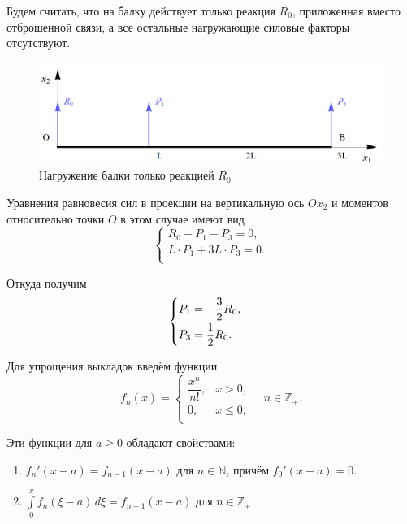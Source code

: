 \documentclass[12pt, a4paper]{article}
\begin{document}
Будем считать, что на балку действует только реакция $R_0$, приложенная вместо отброшенной связи, а все остальные нагружающие силовые факторы отсутствуют.

\begin{figure}[!h]
	\centering
	\includegraphics[width=0.75\linewidth]{plot-4}
	\caption{Нагружение балки только реакцией $R_0$}
\end{figure}

Уравнения равновесия сил в проекции на вертикальную ось $Ox_2$ и моментов относительно точки $O$ в этом случае имеют вид
\vspace{-0.5em}
\begin{equation*}
	\begin{cases}
		R_0 + P_1 + P_3 = 0, \\ 
		L \cdot P_1 + 3L \cdot P_3 = 0. \\
	\end{cases}
\end{equation*}

Откуда получим
\begin{equation}
	\begin{cases} \vspace{0.25em}
		P_1 = - \dfrac{3}{2} R_0, \\ 
		P_3 = \dfrac{1}{2} R_0. \\
	\end{cases}
	\label{eqP0P1R}
\end{equation}

Для упрощения выкладок введём функции
\[
f_n(x) = 
\begin{cases}
	\dfrac{x^n}{n!}, & x > 0, \\ 
	0, & x \leq 0, \\
\end{cases}
\quad n \in \mathbb{Z}_+.
\]

\newpage

Эти функции для $a \geq 0$ обладают свойствами:
\begin{enumerate}
	\item $f_n'(x - a) = f_{n-1}(x - a)$ для $n \in \mathbb{N}$, причём $f_0'(x - a) = 0$.
	
	\vspace{0.25em}
	
	\item $\int\limits_0^{x} f_n(\xi - a) \, d \xi = f_{n+1}(x - a)$ для $n \in \mathbb{Z}_+$.
\end{enumerate}
\end{document}
